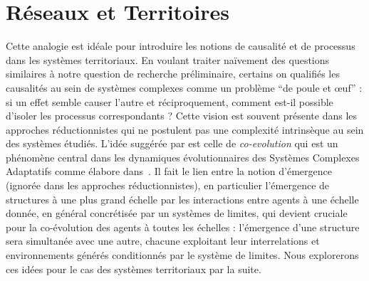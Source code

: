 






\chapter{Réseaux et Territoires} %

\label{ch:thematic} %


%






\bigskip


Cette analogie est idéale pour introduire les notions de causalité et de processus dans les systèmes territoriaux. En voulant traiter naïvement des questions similaires à notre question de recherche préliminaire, certains on qualifiés les causalités au sein de systèmes complexes comme un problème ``de poule et {\oe}uf'' : si un effet semble causer l'autre et réciproquement, comment est-il possible d'isoler les processus correspondants ? Cette vision est souvent présente dans les approches réductionnistes qui ne postulent pas une complexité intrinsèque au sein des systèmes étudiés. L'idée suggérée par  est celle de \emph{co-evolution} qui est un phénomène central dans les dynamiques évolutionnaires des Systèmes Complexes Adaptatifs comme  élabore dans~\cite{holland2012signals}. Il fait le lien entre la notion d'émergence (ignorée dans les approches réductionnistes), en particulier l'émergence de structures à une plus grand échelle par les interactions entre agents à une échelle donnée, en général concrétisée par un systèmes de limites, qui devient cruciale pour la co-évolution des agents à toutes les échelles : l'émergence d'une structure sera simultanée avec une autre, chacune exploitant leur interrelations et environnements générés conditionnés par le système de limites. Nous explorerons ces idées pour le cas des systèmes territoriaux par la suite.


